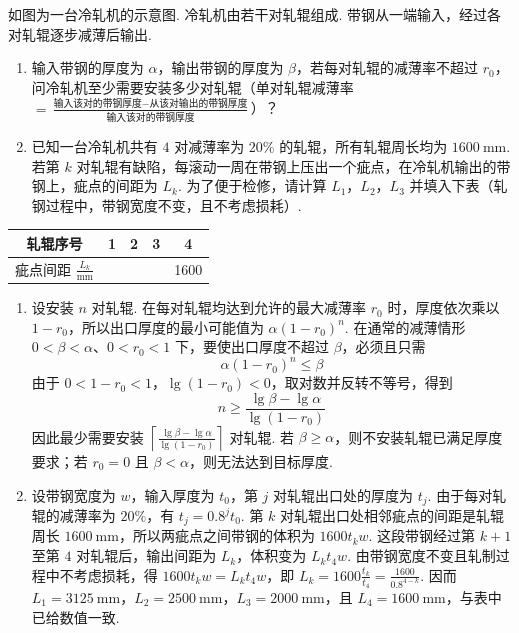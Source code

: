 \begin{problem}
如图为一台冷轧机的示意图. 冷轧机由若干对轧辊组成. 带钢从一端输入，经过各对轧辊逐步减薄后输出.

\begin{enumerate}
\item 输入带钢的厚度为 \(\alpha\)，输出带钢的厚度为 \(\beta\)，若每对轧辊的减薄率不超过 \(r_0\)，问冷轧机至少需要安装多少对轧辊（单对轧辊减薄率 \(=\frac{\text{输入该对的带钢厚度}-\text{从该对输出的带钢厚度}}{\text{输入该对的带钢厚度}}\)）？
\item 已知一台冷轧机共有 \(4\) 对减薄率为 \(20\%\) 的轧辊，所有轧辊周长均为 \(1600 \mathrm{~mm}\). 若第 \(k\) 对轧辊有缺陷，每滚动一周在带钢上压出一个疵点，在冷轧机输出的带钢上，疵点的间距为 \(L_k\). 为了便于检修，请计算 \(L_1\)，\(L_2\)，\(L_3\) 并填入下表（轧钢过程中，带钢宽度不变，且不考虑损耗）.
\end{enumerate}

\begin{center}
\begin{tabular}{|c|c|c|c|c|}
\hline
轧辊序号 & 1 & 2 & 3 & 4 \\
\hline
疵点间距 \(\frac{L_k}{\mathrm{mm}}\) &  &  &  & 1600 \\
\hline
\end{tabular}
\end{center}

\end{problem}

\begin{solution}
\begin{enumerate}
\item 设安装 \(n\) 对轧辊. 在每对轧辊均达到允许的最大减薄率 \(r_0\) 时，厚度依次乘以 \(1-r_0\)，所以出口厚度的最小可能值为 \(\alpha(1-r_0)^n\). 在通常的减薄情形 \(0<\beta<\alpha\)、\(0<r_0<1\) 下，要使出口厚度不超过 \(\beta\)，必须且只需
\[
\alpha(1-r_0)^n\leqslant\beta
\]
由于 \(0<1-r_0<1\)，\(\lg(1-r_0)<0\)，取对数并反转不等号，得到
\[
n\geqslant\frac{\lg\beta-\lg\alpha}{\lg(1-r_0)}
\]
因此最少需要安装 \(\left\lceil\frac{\lg\beta-\lg\alpha}{\lg(1-r_0)}\right\rceil\) 对轧辊. 若 \(\beta\geqslant\alpha\)，则不安装轧辊已满足厚度要求；若 \(r_0=0\) 且 \(\beta<\alpha\)，则无法达到目标厚度.
\item 设带钢宽度为 \(w\)，输入厚度为 \(t_0\)，第 \(j\) 对轧辊出口处的厚度为 \(t_j\). 由于每对轧辊的减薄率为 \(20\%\)，有 \(t_j=0.8^j t_0\). 第 \(k\) 对轧辊出口处相邻疵点的间距是轧辊周长 \(1600\mathrm{~mm}\)，所以两疵点之间带钢的体积为 \(1600t_kw\). 这段带钢经过第 \(k+1\) 至第 \(4\) 对轧辊后，输出间距为 \(L_k\)，体积变为 \(L_kt_4w\). 由带钢宽度不变且轧制过程中不考虑损耗，得 \(1600t_kw=L_kt_4w\)，即 \(L_k=1600\frac{t_k}{t_4}=\frac{1600}{0.8^{4-k}}\). 因而 \(L_1=3125\mathrm{~mm}\)，\(L_2=2500\mathrm{~mm}\)，\(L_3=2000\mathrm{~mm}\)，且 \(L_4=1600\mathrm{~mm}\)，与表中已给数值一致.
\end{enumerate}
\end{solution}


